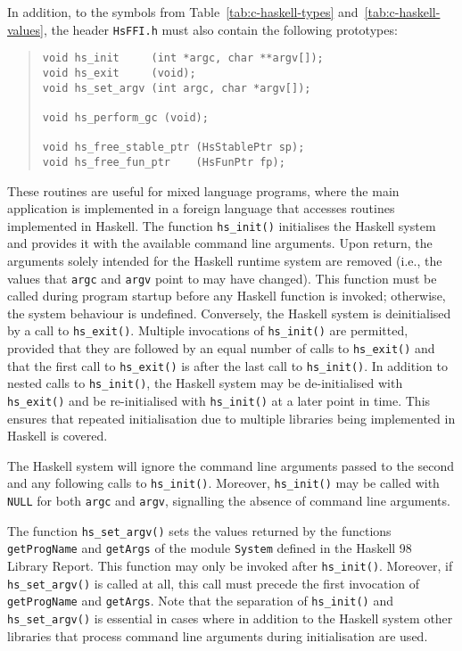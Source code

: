 \documentclass[a4paper,twoside]{article}
\newcommand{\code}[1]{\texttt{#1}}      %
\begin{document}
In addition, to the symbols from Table~\ref{tab:c-haskell-types}
and~\ref{tab:c-haskell-values}, the header \code{HsFFI.h} must also contain
the following prototypes:
%
\begin{quote}
\begin{verbatim}
void hs_init     (int *argc, char **argv[]);
void hs_exit     (void);
void hs_set_argv (int argc, char *argv[]);

void hs_perform_gc (void);

void hs_free_stable_ptr (HsStablePtr sp);
void hs_free_fun_ptr    (HsFunPtr fp);
\end{verbatim}
\end{quote}
%
These routines are useful for mixed language programs, where the main
application is implemented in a foreign language that accesses routines
implemented in Haskell.  The function \code{hs\_init()} initialises the
Haskell system and provides it with the available command line arguments.
Upon return, the arguments solely intended for the Haskell runtime system are
removed (i.e., the values that \code{argc} and \code{argv} point to may have
changed).  This function must be called during program startup before any
Haskell function is invoked; otherwise, the system behaviour is undefined.
Conversely, the Haskell system is deinitialised by a call to
\code{hs\_exit()}.  Multiple invocations of \code{hs\_init()} are permitted,
provided that they are followed by an equal number of calls to
\code{hs\_exit()} and that the first call to \code{hs\_exit()} is after the
last call to \code{hs\_init()}.  In addition to nested calls to
\code{hs\_init()}, the Haskell system may be de-initialised with
\code{hs\_exit()} and be re-initialised with \code{hs\_init()} at a later
point in time.  This ensures that repeated initialisation due to multiple
libraries being implemented in Haskell is covered.

The Haskell system will ignore the command line arguments passed to the second
and any following calls to \code{hs\_init()}.  Moreover, \code{hs\_init()} may
be called with \code{NULL} for both \code{argc} and \code{argv}, signalling
the absence of command line arguments.

The function \code{hs\_set\_argv()} sets the values returned by the functions
\code{getProgName} and \code{getArgs} of the module \code{System} defined in
the Haskell 98 Library Report.  This function may only be invoked after
\code{hs\_init()}.  Moreover, if \code{hs\_set\_argv()} is called at all, this
call must precede the first invocation of \code{getProgName} and
\code{getArgs}.  Note that the separation of \code{hs\_init()} and
\code{hs\_set\_argv()} is essential in cases where in addition to the Haskell
system other libraries that process command line arguments during
initialisation are used.
\end{document}
